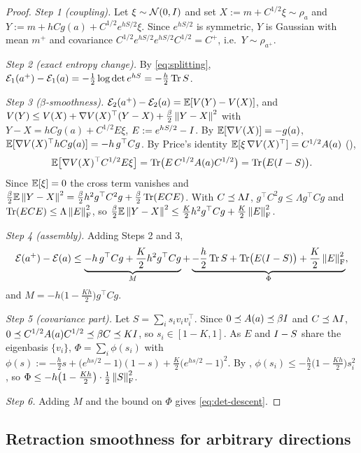 \begin{proof}
\emph{Step 1 (coupling).} Let $\xi\sim\mathcal{N}(0,I)$ and set $X:=m+C^{1/2}\xi\sim\rho_a$ and
$Y:=m+hCg(a)+C^{1/2}e^{hS/2}\xi$. Since $e^{hS/2}$ is symmetric, $Y$ is Gaussian with mean $m^+$
and covariance $C^{1/2}e^{hS/2}e^{hS/2}C^{1/2}=C^+$, i.e.\ $Y\sim\rho_{a^+}$.

\emph{Step 2 (exact entropy change).} By \eqref{eq:splitting},
$\mathcal{E}_1(a^+)-\mathcal{E}_1(a)=-\tfrac12\log\det e^{hS}=-\frac h2\operatorname{Tr} S$.

\emph{Step 3 ($\beta$-smoothness).} $\mathcal{E}_2(a^+)-\mathcal{E}_2(a)=\mathbb{E}[V(Y)-V(X)]$, and
$V(Y)\leq V(X)+\nabla V(X)^\top(Y-X)+\tfrac\beta2\left\lVert Y-X\right\rVert^2$ with
$Y-X=hCg(a)+C^{1/2}E\xi$, $E:=e^{hS/2}-I$.
By $\mathbb{E}[\nabla V(X)]=-g(a)$, $\mathbb{E}[\nabla V(X)^\top hCg(a)]=-h\,g^\top Cg$. By Price's identity
$\mathbb{E}[\xi\,\nabla V(X)^\top]=C^{1/2}A(a)$ (),
\[
    \mathbb{E}\bigl[\nabla V(X)^\top C^{1/2}E\xi\bigr]
    =\operatorname{Tr}\bigl(E\,C^{1/2}A(a)C^{1/2}\bigr)
    =\operatorname{Tr}\bigl(E(I-S)\bigr).
\]
Since $\mathbb{E}[\xi]=0$ the cross term vanishes and
$\tfrac\beta2\mathbb{E}\left\lVert Y-X\right\rVert^2=\tfrac\beta2h^2g^\top C^2g+\tfrac\beta2\operatorname{Tr}(ECE)$. With
$C\preceq\Lambda I$, $g^\top C^2g\leq\Lambda g^\top Cg$ and $\operatorname{Tr}(ECE)\leq\Lambda\left\lVert E\right\rVert_{\mathrm{F}}^2$,
so $\tfrac\beta2\mathbb{E}\left\lVert Y-X\right\rVert^2\leq\tfrac K2h^2g^\top Cg+\tfrac K2\left\lVert E\right\rVert_{\mathrm{F}}^2$.

\emph{Step 4 (assembly).} Adding Steps 2 and 3,
\[
    \mathcal{E}(a^+)-\mathcal{E}(a)
    \leq
    \underbrace{-h\,g^\top Cg+\frac K2h^2g^\top Cg}_{M}
    +\underbrace{-\frac h2\operatorname{Tr} S+\operatorname{Tr}\bigl(E(I-S)\bigr)+\frac K2\left\lVert E\right\rVert_{\mathrm{F}}^2}_{\Phi},
\]
and $M=-h\bigl(1-\tfrac{Kh}2\bigr)g^\top Cg$.

\emph{Step 5 (covariance part).} Let $S=\sum_is_iv_iv_i^\top$. Since $0\preceq A(a)\preceq\beta I$
and $C\preceq\Lambda I$, $0\preceq C^{1/2}A(a)C^{1/2}\preceq\beta C\preceq KI$, so
$s_i\in[1-K,1]$. As $E$ and $I-S$ share the eigenbasis $\{v_i\}$,
$\Phi=\sum_i\phi(s_i)$ with
$\phi(s):=-\tfrac h2s+\bigl(e^{hs/2}-1\bigr)(1-s)+\tfrac K2\bigl(e^{hs/2}-1\bigr)^2$.
By , $\phi(s_i)\leq-\tfrac h2\bigl(1-\tfrac{Kh}2\bigr)s_i^2$, so
$\Phi\leq-h\bigl(1-\tfrac{Kh}2\bigr)\cdot\tfrac12\left\lVert S\right\rVert_{\mathrm{F}}^2$.

\emph{Step 6.} Adding $M$ and the bound on $\Phi$ gives \eqref{eq:det-descent}.
\end{proof}

\subsection{Retraction smoothness for arbitrary directions}

